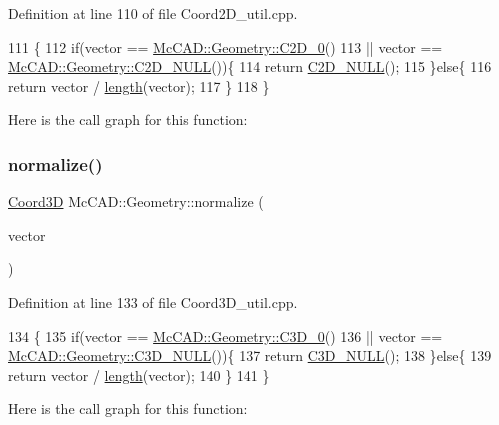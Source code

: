 Definition at line 110 of file Coord2\+D\+\_\+util.\+cpp.


\begin{DoxyCode}
111                               \{
112     \textcolor{keywordflow}{if}(vector == \hyperlink{namespaceMcCAD_1_1Geometry_a1839f640b92275bf5245e918fa8a2137}{McCAD::Geometry::C2D\_0}()
113             || vector == \hyperlink{namespaceMcCAD_1_1Geometry_a14ff5fd2db066e4dfad0a638f03762a2}{McCAD::Geometry::C2D\_NULL}())\{
114         \textcolor{keywordflow}{return} \hyperlink{namespaceMcCAD_1_1Geometry_a14ff5fd2db066e4dfad0a638f03762a2}{C2D\_NULL}();
115     \}\textcolor{keywordflow}{else}\{
116         \textcolor{keywordflow}{return} vector / \hyperlink{namespaceMcCAD_1_1Geometry_ad2997914c766f1fc561cdd30032b6777}{length}(vector);
117     \}
118 \}
\end{DoxyCode}
Here is the call graph for this function\+:
\mbox{\label{namespaceMcCAD_1_1Geometry_a3720c38ff5b715f74b93cbd776862e44}} 
\subsubsection{\texorpdfstring{normalize()}{normalize()}\hspace{0.1cm}{\footnotesize\ttfamily [2/2]}}
{\footnotesize\ttfamily \hyperlink{classMcCAD_1_1Geometry_1_1Coord3D}{Coord3D} Mc\+C\+A\+D\+::\+Geometry\+::normalize (\begin{DoxyParamCaption}\item[{const \hyperlink{classMcCAD_1_1Geometry_1_1Coord3D}{Coord3D} \&}]{vector }\end{DoxyParamCaption})}



Definition at line 133 of file Coord3\+D\+\_\+util.\+cpp.


\begin{DoxyCode}
134                               \{
135     \textcolor{keywordflow}{if}(vector == \hyperlink{namespaceMcCAD_1_1Geometry_a93fd5c6be0d76b39b101166f54da0a47}{McCAD::Geometry::C3D\_0}()
136             || vector == \hyperlink{namespaceMcCAD_1_1Geometry_ae08bc63c64f6c022b784d73e474724f3}{McCAD::Geometry::C3D\_NULL}())\{
137         \textcolor{keywordflow}{return} \hyperlink{namespaceMcCAD_1_1Geometry_ae08bc63c64f6c022b784d73e474724f3}{C3D\_NULL}();
138     \}\textcolor{keywordflow}{else}\{
139         \textcolor{keywordflow}{return} vector / \hyperlink{namespaceMcCAD_1_1Geometry_ad2997914c766f1fc561cdd30032b6777}{length}(vector);
140     \}
141 \}
\end{DoxyCode}
Here is the call graph for this function\+:
\mbox{\label{namespaceMcCAD_1_1Geometry_add5d54ddf5e5c6c8c8431148218fb231}} 

